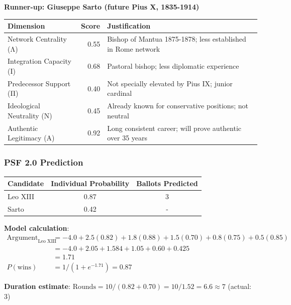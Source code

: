 \documentclass[11pt,a4paper]{article}
\begin{document}
\textbf{Runner-up: Giuseppe Sarto (future Pius X, 1835-1914)}

\begin{center}
\begin{tabular}{lrp{4cm}}
\toprule
\textbf{Dimension} & \textbf{Score} & \textbf{Justification} \\
\midrule
Network Centrality (Λ) & 0.55 & Bishop of Mantua 1875-1878; less established in Rome network \\
Integration Capacity (Ι) & 0.68 & Pastoral bishop; less diplomatic experience \\
Predecessor Support (Π) & 0.40 & Not specially elevated by Pius IX; junior cardinal \\
Ideological Neutrality (Ν) & 0.45 & Already known for conservative positions; not neutral \\
Authentic Legitimacy (Α) & 0.92 & Long consistent career; will prove authentic over 35 years \\
\bottomrule
\end{tabular}
\end{center}

\subsubsection{PSF 2.0 Prediction}

\begin{center}
\begin{tabular}{lcc}
\toprule
\textbf{Candidate} & \textbf{Individual Probability} & \textbf{Ballots Predicted} \\
\midrule
Leo XIII & 0.87 & 3 \\
Sarto & 0.42 & - \\
\bottomrule
\end{tabular}
\end{center}

\textbf{Model calculation}:
\begin{equation}
\begin{split}
\text{Argument}_{\text{Leo XIII}} &= -4.0 + 2.5(0.82) + 1.8(0.88) + 1.5(0.70) + 0.8(0.75) + 0.5(0.85) \\
&= -4.0 + 2.05 + 1.584 + 1.05 + 0.60 + 0.425 \\
&= 1.71 \\
P(\text{wins}) &= 1 / (1 + e^{-1.71}) = 0.87
\end{split}
\end{equation}

\textbf{Duration estimate}: $\text{Rounds} = 10 / (0.82 + 0.70) = 10 / 1.52 = 6.6 \approx 7$ (actual: 3)
\end{document}
